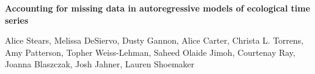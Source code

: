 \documentclass{article}
\begin{document}

{\Large \noindent \bf %
Accounting for missing data in autoregressive models of ecological time series
}

\medskip

\noindent Alice Stears, Melissa DeSiervo, Dusty Gannon, Alice Carter, Christa L. Torrens, Amy Patterson, Topher Weiss-Lehman, Saheed Olaide Jimoh, Courtenay Ray, Joanna Blaszczak, Josh Jahner, Lauren Shoemaker


\clearpage

\begin{linenumbers}


\end{linenumbers}
\end{document}
